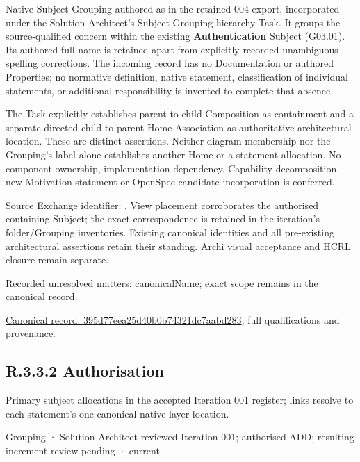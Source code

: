 Native Subject Grouping authored as \texttt{} in the retained 004 export,
incorporated under the Solution Architect's Subject Grouping hierarchy Task.
It groups the source-qualified \texttt{} concern within
the existing \textbf{Authentication} Subject (G03.01). Its authored full name
is retained apart from explicitly recorded unambiguous spelling corrections.
The incoming record has no Documentation or authored Properties; no normative
definition, native statement, classification of individual statements, or
additional responsibility is invented to complete that absence.



The Task explicitly establishes parent-to-child Composition as containment and
a separate directed child-to-parent Home Association as authoritative architectural
location. These are distinct assertions. Neither diagram membership nor the
Grouping's label alone establishes another Home or a statement allocation.
No component ownership, implementation dependency, Capability decomposition,
new Motivation statement or OpenSpec candidate incorporation is conferred.



Source Exchange identifier: \texttt{}. View placement corroborates
the authorised containing Subject; the exact correspondence is retained in the
iteration's folder/Grouping inventories. Existing canonical identities and all
pre-existing architectural assertions retain their standing. Archi visual
acceptance and HCRL closure remain separate.


{\small Recorded unresolved matters: canonicalName; exact scope remains in the canonical record.}\par
{\footnotesize \href{../../../../continuum/grouping/395d77eea25d40b0b74321dc7aabd283.md}{Canonical record: 395d77eea25d40b0b74321dc7aabd283}; full qualifications and provenance.}\par
\subsection*{R.3.3.2 Authorisation}
\label{navigation:R.3.3.2}

Primary subject allocations in the accepted Iteration 001 register; links resolve to each statement’s one canonical native-layer location.\par
\label{element:4648cf5a1f8e4333978c13efae10eaa5}
{\small Grouping · Solution Architect-reviewed Iteration 001; authorised ADD; resulting increment review pending · current}\par

